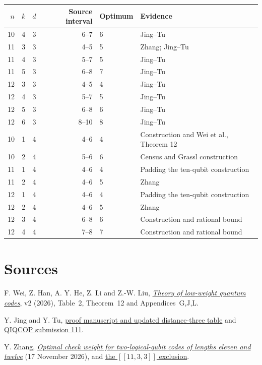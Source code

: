 \documentclass[11pt]{article}
\begin{document}
\begin{center}
\begin{tabular}{rrrrll}
\toprule
$n$ & $k$ & $d$ & Source interval & Optimum & Evidence \\\midrule
10 & 4 & 3 & 6--7  & 6 & Jing--Tu \\
11 & 3 & 3 & 4--5  & 5 & Zhang; Jing--Tu \\
11 & 4 & 3 & 5--7  & 5 & Jing--Tu \\
11 & 5 & 3 & 6--8  & 7 & Jing--Tu \\
12 & 3 & 3 & 4--5  & 4 & Jing--Tu \\
12 & 4 & 3 & 5--7  & 5 & Jing--Tu \\
12 & 5 & 3 & 6--8  & 6 & Jing--Tu \\
12 & 6 & 3 & 8--10 & 8 & Jing--Tu \\\midrule
10 & 1 & 4 & 4--6 & 4 & Construction and Wei et al., Theorem 12 \\
10 & 2 & 4 & 5--6 & 6 & Census and Grassl construction \\
11 & 1 & 4 & 4--6 & 4 & Padding the ten-qubit construction \\
11 & 2 & 4 & 4--6 & 5 & Zhang \\
12 & 1 & 4 & 4--6 & 4 & Padding the ten-qubit construction \\
12 & 2 & 4 & 4--6 & 5 & Zhang \\
12 & 3 & 4 & 6--8 & 6 & Construction and rational bound \\
12 & 4 & 4 & 7--8 & 7 & Construction and rational bound \\\bottomrule
\end{tabular}
\end{center}

\section*{Sources}
\small
F. Wei, Z. Han, A. Y. He, Z. Li and Z.-W. Liu, \href{https://arxiv.org/html/2601.19848v2}{\emph{Theory of low-weight quantum codes}}, v2 (2026), Table~2, Theorem~12 and Appendices~G,J,L.

Y. Jing and Y. Tu, \href{https://github.com/Ivann1242/optimal-check-weight-11-3-3/blob/a422af71819277c05fafc1a9f69d0cd5a10a35f0/paper/main.tex}{proof manuscript and updated distance-three table} and \href{https://github.com/Naixu-Guo/quantum-open-problems/pull/111}{QIQCOP submission 111}.

Y. Zhang, \href{https://yuxuanzhang1995.github.io/agentic-research/lowweight-two-logical-distance-four/}{\emph{Optimal check weight for two-logical-qubit codes of lengths eleven and twelve}} (17 November 2026), and \href{https://yuxuanzhang1995.github.io/agentic-research/lowweight-11-3-3/}{the $[[11,3,3]]$ exclusion}.
\end{document}
